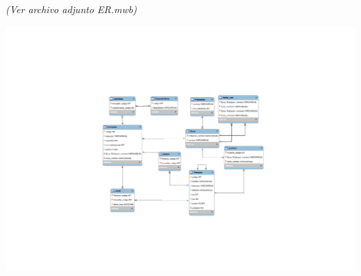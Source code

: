 \documentclass[12pt]{article}
\begin{document}
\textit{(Ver archivo adjunto ER.mwb)}

\vspace{3cm}
\hspace{-5cm}
\includegraphics[scale=.7, trim=0.5cm 11cm 0.5cm 11cm]{ER.pdf}
\end{document}
